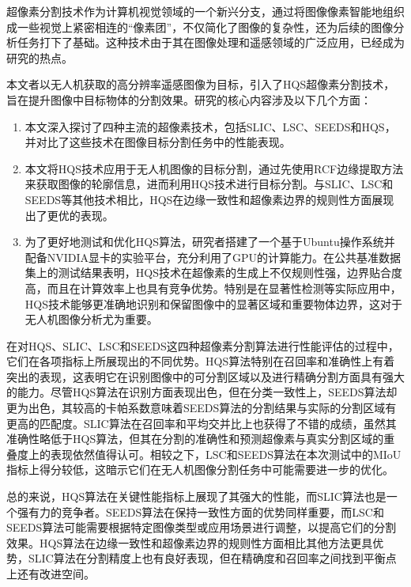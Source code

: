 超像素分割技术作为计算机视觉领域的一个新兴分支，通过将图像像素智能地组织成一些视觉上紧密相连的“像素团”，不仅简化了图像的复杂性，还为后续的图像分析任务打下了基础。这种技术由于其在图像处理和遥感领域的广泛应用，已经成为研究的热点。

本文者以无人机获取的高分辨率遥感图像为目标，引入了HQS超像素分割技术，旨在提升图像中目标物体的分割效果。研究的核心内容涉及以下几个方面：

\begin{enumerate}
\item 本文深入探讨了四种主流的超像素技术，包括SLIC、LSC、SEEDS和HQS，并对比了这些技术在图像目标分割任务中的性能表现。
\item 本文将HQS技术应用于无人机图像的目标分割，通过先使用RCF边缘提取方法来获取图像的轮廓信息，进而利用HQS技术进行目标分割。与SLIC、LSC和SEEDS等其他技术相比，HQS在边缘一致性和超像素边界的规则性方面展现出了更优的表现。
\item 为了更好地测试和优化HQS算法，研究者搭建了一个基于Ubuntu操作系统并配备NVIDIA显卡的实验平台，充分利用了GPU的计算能力。在公共基准数据集上的测试结果表明，HQS技术在超像素的生成上不仅规则性强，边界贴合度高，而且在计算效率上也具有竞争优势。特别是在显著性检测等实际应用中，HQS技术能够更准确地识别和保留图像中的显著区域和重要物体边界，这对于无人机图像分析尤为重要。
\end{enumerate}

在对HQS、SLIC、LSC和SEEDS这四种超像素分割算法进行性能评估的过程中，它们在各项指标上所展现出的不同优势。HQS算法特别在召回率和准确性上有着突出的表现，这表明它在识别图像中的可分割区域以及进行精确分割方面具有强大的能力。尽管HQS算法在识别方面表现出色，但在分类一致性上，SEEDS算法却更为出色，其较高的卡帕系数意味着SEEDS算法的分割结果与实际的分割区域有更高的匹配度。SLIC算法在召回率和平均交并比上也获得了不错的成绩，虽然其准确性略低于HQS算法，但其在分割的准确性和预测超像素与真实分割区域的重叠度上的表现依然值得认可。相较之下，LSC和SEEDS算法在本次测试中的MIoU指标上得分较低，这暗示它们在无人机图像分割任务中可能需要进一步的优化。

总的来说，HQS算法在关键性能指标上展现了其强大的性能，而SLIC算法也是一个强有力的竞争者。SEEDS算法在保持一致性方面的优势同样重要，而LSC和SEEDS算法可能需要根据特定图像类型或应用场景进行调整，以提高它们的分割效果。HQS算法在边缘一致性和超像素边界的规则性方面相比其他方法更具优势，SLIC算法在分割精度上也有良好表现，但在精确度和召回率之间找到平衡点上还有改进空间。

